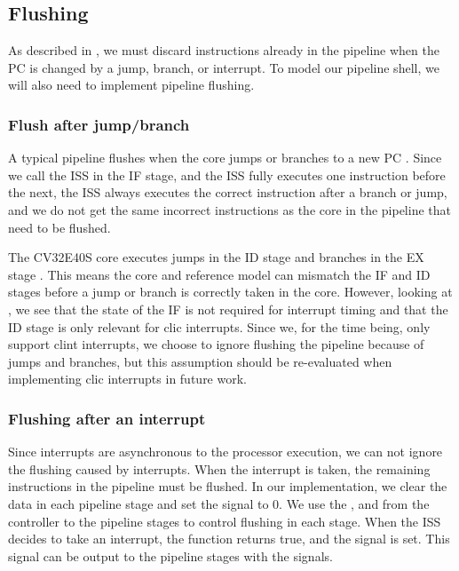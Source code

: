 \subsection{Flushing}

As described in , we must discard instructions already in the pipeline when the PC is changed by a jump, branch, or interrupt.
To model our pipeline shell, we will also need to implement pipeline flushing.

\subsubsection{Flush after jump/branch}

A typical pipeline flushes when the core jumps or branches to a new PC \cite{pattersonComputerOrganizationDesign2021}. Since we call the ISS in the IF stage, and the ISS fully executes one instruction before the next, the ISS always executes the correct instruction after a branch or jump, and we do not get the same incorrect instructions as the core in the pipeline that need to be flushed.

The CV32E40S core executes jumps in the ID stage and branches in the EX stage \cite{openhwgroupPipelineDetailsCOREV2023}. This means the core and reference model can mismatch the IF and ID stages before a jump or branch is correctly taken in the core. However, looking at , we see that the state of the IF is not required for interrupt timing and that the ID stage is only relevant for \acrshort{clic} interrupts. Since we, for the time being, only support \acrshort{clint} interrupts, we choose to ignore flushing the pipeline because of jumps and branches, but this assumption should be re-evaluated when implementing \acrshort{clic} interrupts in future work.


\subsubsection{Flushing after an interrupt}

Since interrupts are asynchronous to the processor execution, we can not ignore the flushing caused by interrupts. When the interrupt is taken, the remaining instructions in the pipeline must be flushed. In our implementation, we clear the  data in each pipeline stage and set the  signal to 0. We use the , and  from the controller to the pipeline stages to control flushing in each stage. When the ISS decides to take an interrupt, the  function returns true, and the  signal is set. This signal can be output to the pipeline stages with the  signals.


